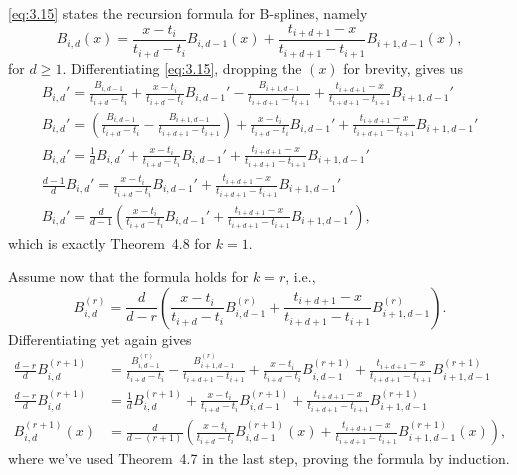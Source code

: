 \begin{solution}
    \cref{eq:3.15} states the recursion formula for B-splines, namely
    \begin{equation}\label{eq:3.15}
        B_{i, d}(x)
        = \frac{x - t_i}{t_{i+d} - t_i} B_{i, d-1}(x)
        + \frac{t_{i+d+1} - x}{t_{i+d+1} - t_{i+1}} B_{i+1, d-1}(x),
        \tag{3.15}
    \end{equation}
    for $d \geq 1$.
    Differentiating \cref{eq:3.15}, dropping the $(x)$ for brevity, gives us
    \begin{gather*}
        B_{i, d}'
        = \frac{B_{i, d-1}}{t_{i+d} - t_i}
        + \frac{x - t_i}{t_{i+d} - t_i} B_{i, d-1}'
        - \frac{B_{i+1, d-1}}{t_{i+d+1} - t_{i+1}}
        + \frac{t_{i+d+1} - x}{t_{i+d+1} - t_{i+1}} B_{i+1, d-1}' \\
        B_{i, d}' = \left(
            \frac{B_{i, d-1}}{t_{i+d} - t_i}
            -  \frac{B_{i+1, d-1}}{t_{i+d+1} - t_{i+1}}
        \right)
        + \frac{x - t_i}{t_{i+d} - t_i} B_{i, d-1}'
        + \frac{t_{i+d+1} - x}{t_{i+d+1} - t_{i+1}} B_{i+1, d-1}' \\
        B_{i, d}' = \frac{1}{d} B_{i, d}'
        + \frac{x - t_i}{t_{i+d} - t_i} B_{i, d-1}'
        + \frac{t_{i+d+1} - x}{t_{i+d+1} - t_{i+1}} B_{i+1, d-1}' \\
        \frac{d - 1}{d} B_{i, d}'
        = \frac{x - t_i}{t_{i+d} - t_i} B_{i, d-1}'
        + \frac{t_{i+d+1} - x}{t_{i+d+1} - t_{i+1}} B_{i+1, d-1}' \\
        B_{i, d}' =
        \frac{d}{d - 1} \left(
            \frac{x - t_i}{t_{i+d} - t_i} B_{i, d-1}'
            + \frac{t_{i+d+1} - x}{t_{i+d+1} - t_{i+1}} B_{i+1, d-1}'
        \right),
    \end{gather*}
    which is exactly Theorem~4.8 for $k = 1$.

    Assume now that the formula holds for $k = r$, i.e.,
    \begin{equation}
        B_{i, d}^{(r)}
        = \frac{d}{d - r} \left(
            \frac{x - t_i}{t_{i+d} - t_i} B_{i, d-1}^{(r)}
            + \frac{t_{i+d+1} - x}{t_{i+d+1} - t_{i+1}} B_{i+1, d-1}^{(r)}
        \right).
    \end{equation}
    Differentiating yet again gives
    \begin{align*}
        \frac{d - r}{d} B_{i, d}^{(r+1)}
        &= \frac{B_{i, d-1}^{(r)}}{t_{i+d} - t_i} - \frac{B_{i+1, d-1}^{(r)}}{t_{i+d+1} - t_{i+1}}
        + \frac{x - t_i}{t_{i+d} - t_i} B_{i, d-1}^{(r+1)}
        + \frac{t_{i+d+1} - x}{t_{i+d+1} - t_{i+1}} B_{i+1, d-1}^{(r+1)} \\
        \frac{d - r}{d} B_{i, d}^{(r+1)}
        &= \frac{1}{d} B_{i, d}^{(r+1)}
        + \frac{x - t_i}{t_{i+d} - t_i} B_{i, d-1}^{(r+1)}
        + \frac{t_{i+d+1} - x}{t_{i+d+1} - t_{i+1}} B_{i+1, d-1}^{(r+1)} \\
        B_{i, d}^{(r+1)}(x)
        &= \frac{d}{d - (r + 1)} \left(
            \frac{x - t_i}{t_{i+d} - t_i} B_{i, d-1}^{(r+1)} (x)
            + \frac{t_{i+d+1} - x}{t_{i+d+1} - t_{i+1}} B_{i+1, d-1}^{(r+1)} (x)
        \right),
    \end{align*}
    where we've used Theorem~4.7 in the last step, proving the formula by induction.
\end{solution}